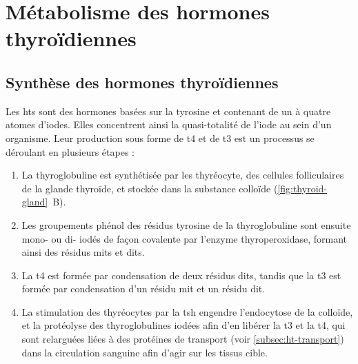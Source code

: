 




\section{Métabolisme des hormones thyroïdiennes}\label{subsec:ht-metabolism}


\subsection{Synthèse des hormones thyroïdiennes}

Les \glspl{ht} sont des hormones basées sur la tyrosine et contenant de un à quatre atomes d'iodes.
Elles concentrent ainsi la quasi-totalité de l'iode au sein d'un organisme.
Leur production sous forme de \gls{t4} et de \gls{t3} est un processus se déroulant en plusieurs étapes :
\begin{enumerate}
\item La thyroglobuline est synthétisée par les thyréocyte, des cellules folliculaires de la glande thyroïde, et stockée dans la substance colloïde (\autoref{fig:thyroid-gland}~B).
\item Les groupements phénol des résidus tyrosine de la thyroglobuline sont ensuite mono- ou di- iodés de façon covalente par l'enzyme thyroperoxidase, formant ainsi des résidus \glspl{mit} et \glspl{dit}.
\item La \gls{t4} est formée par condensation de deux résidus \glspl{dit}, tandis que la \gls{t3} est formée par condensation d'un résidu \gls{mit} et un résidu \gls{dit}.
\item La stimulation des thyréocytes par la \gls{tsh} engendre l'endocytose de la colloïde, et la protéolyse des thyroglobulines iodées afin d'en libérer la \gls{t3} et la \gls{t4}, qui sont relarguées liées à des protéines de transport (voir \autoref{subsec:ht-transport}) dans la circulation sanguine afin d'agir sur les tissus cible.
\end{enumerate}


